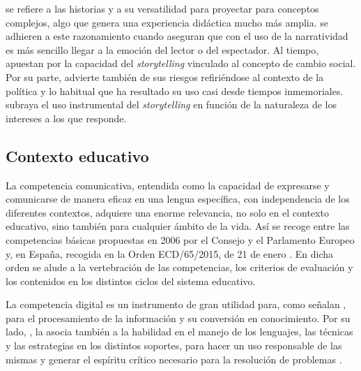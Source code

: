 \documentclass[spanish]{textolivre}
\begin{document}
\textcite{green_storytelling_2004} se refiere a las historias y a su versatilidad para proyectar para conceptos complejos, algo que genera una experiencia didáctica mucho más amplia. \textcite{lugmayr_serious_2017} se adhieren a este razonamiento cuando aseguran que con el uso de la narratividad es más sencillo llegar a la emoción del lector o del espectador. Al tiempo, \textcite{reinsborough_re:_2017} apuestan por la capacidad del \textit{storytelling} vinculado al concepto de cambio social. Por su parte, \textcite{salmon_storytelling:_2008} advierte también de sus riesgos refiriéndose al contexto de la política y lo habitual que ha resultado su uso casi desde tiempos inmemoriales. \textcite{vizcaino_alcantud_storytelling_2017} subraya el uso instrumental del \textit{storytelling} en función de la naturaleza de los intereses a los que responde.

\subsection{Contexto educativo}\label{sec-formato}
La competencia comunicativa, entendida como la capacidad de expresarse y comunicarse de manera eficaz en una lengua específica, con independencia de los diferentes contextos, adquiere una enorme relevancia, no solo en el contexto educativo, sino también para cualquier ámbito de la vida. Así se recoge entre las competencias básicas propuestas en 2006 por el Consejo y el Parlamento Europeo y, en España, recogida en la Orden ECD/65/2015, de 21 de enero \cite{parlamento_europeo_y_consejo_recomendacion_2006,ministerio_de_educacion_cultura_y_deporte_orden_2015}. En dicha orden se alude a la vertebración de las competencias, los criterios de evaluación y los contenidos en los distintos ciclos del sistema educativo. 

La competencia digital es un instrumento de gran utilidad para, como señalan \textcite{hatlevik_digital_2013}, para el procesamiento de la información y su conversión en conocimiento. Por su lado, \textcite{krumsvik_teacher_2014}, la asocia también a la habilidad en el manejo de los lenguajes, las técnicas y las estrategias en los distintos soportes, para hacer un uso responsable de las mismas y generar el espíritu crítico necesario para la resolución de problemas \cite{calvani_digital_2010}. 
\end{document}
